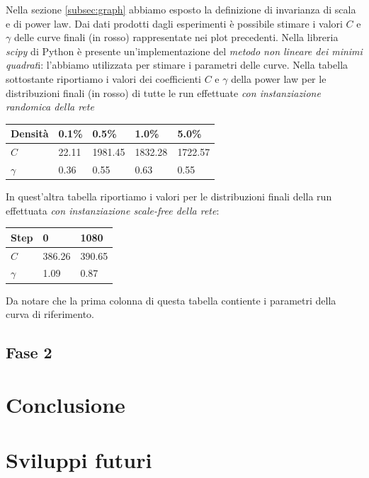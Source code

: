 \documentclass[a4paper,12pt]{article}
\begin{document}
Nella sezione \ref{subsec:graph} abbiamo esposto la definizione di invarianza di scala e di power law. Dai dati prodotti dagli esperimenti è possibile stimare i valori $C$ e $\gamma$ delle curve finali (in rosso) rappresentate nei plot precedenti. Nella libreria \textit{scipy} di Python è presente un'implementazione del \textit{metodo non lineare dei minimi quadrat}i: l'abbiamo utilizzata per stimare i parametri delle curve.
Nella tabella sottostante riportiamo i valori dei coefficienti $C$ e $\gamma$ della power law per le distribuzioni finali (in rosso) di tutte le run effettuate \textit{con instanziazione randomica della rete} 
\begin{center}
    \begin{tabular}{| l | l | l | l | l |}
    \hline
    Densità & 0.1\% & 0.5\% & 1.0\% & 5.0\% \\ \hline \hline
	$C$ & 22.11 & 1981.45 & 1832.28 & 1722.57 \\ \hline
	$\gamma$ & 0.36 & 0.55 & 0.63 & 0.55 \\ \hline
    \end{tabular}
\end{center}
In quest'altra tabella riportiamo i valori per le distribuzioni finali della run effettuata \textit{con instanziazione scale-free della rete}:
\begin{center}
    \begin{tabular}{| l | l | l |}
    \hline
    Step & 0 & 1080 \\ \hline \hline
	$C$ & 386.26 & 390.65 \\ \hline
	$\gamma$ & 1.09 & 0.87 \\ \hline
    \end{tabular}
\end{center}
Da notare che la prima colonna di questa tabella contiente i parametri della curva di riferimento.
\subsection{Fase 2}
\section{Conclusione}
\label{sec:end}
\section{Sviluppi futuri}
\label{sec:future}
\end{document}
